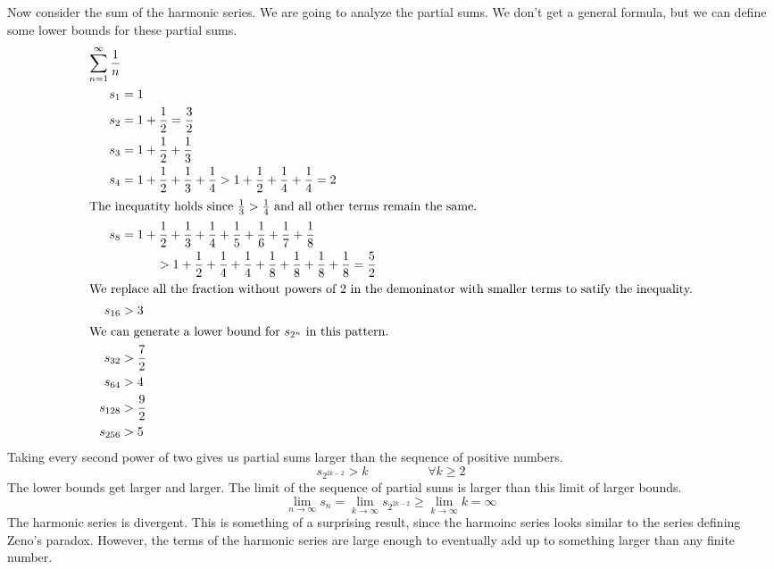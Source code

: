 \documentclass[fleqn,letterpaper]{report}
\begin{document}
\begin{example} Now consider the sum of the harmonic series.
We are going to analyze the partial sums. We don't get a
general formula, but we can define some lower
bounds for these partial sums.
\begin{align*}
\sum_{n=1}^\infty \frac{1}{n} & \\
s_1 & = 1 \\
s_2 & = 1 + \frac{1}{2} = \frac{3}{2} \\
s_3 & = 1 + \frac{1}{2} + \frac{1}{3} \\
s_4 & = 1 + \frac{1}{2} + \frac{1}{3} + \frac{1}{4} > 
1 + \frac{1}{2} + \frac{1}{4} + \frac{1}{4} = 2 \\
\intertext{The inequatity holds since $\frac{1}{3} >
\frac{1}{4}$ and all other terms remain the same.}
s_8 & = 1 + \frac{1}{2} + \frac{1}{3} + \frac{1}{4} +
\frac{1}{5} + \frac{1}{6} + \frac{1}{7} + \frac{1}{8} \\
& \hspace{1cm} > 
1 + \frac{1}{2} + \frac{1}{4} + \frac{1}{4} +
\frac{1}{8} + \frac{1}{8} + \frac{1}{8} + \frac{1}{8} =
\frac{5}{2} \\
\intertext{We replace all the fraction without powers of 2 in
the demoninator with smaller terms to satify the inequality.}
s_{16} & > 3 \\
\intertext{We can generate a lower bound for $s_{2^n}$ in this
pattern.}
s_{32} & > \frac{7}{2} \\
s_{64} & > 4 \\
s_{128} & > \frac{9}{2} \\
s_{256} & > 5 
\end{align*}
Taking every second power of two gives us partial sums larger
than the sequence of positive numbers.
\begin{equation*}
s_{2^{2k-2}} > k \hspace{2cm} \forall k \geq 2
\end{equation*}
The lower bounds get larger and larger. The limit of the
sequence of partial sums is larger than this limit of larger
bounds. 
\begin{equation*}
\lim_{n \rightarrow \infty} s_n = \lim_{k \rightarrow \infty}
s_{2^{2k-2}} \geq \lim_{k \rightarrow \infty}
k = \infty
\end{equation*}
The harmonic series is divergent. This is something of a
surprising result, since the harmoinc series looks similar to
the series defining Zeno's paradox. However, the terms of the
harmonic series are large enough to eventually add up to
something larger than any finite number. 
\end{example}
\end{document}
